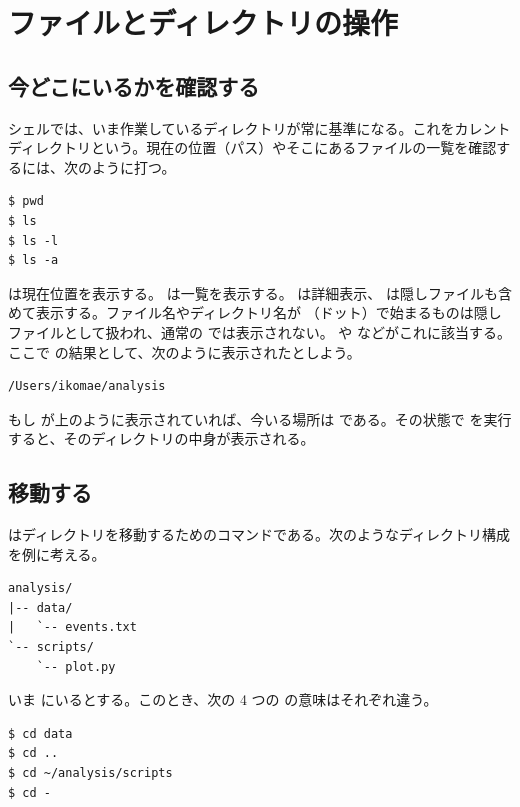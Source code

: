 \section{ファイルとディレクトリの操作}

\subsection{今どこにいるかを確認する}

シェルでは、いま作業しているディレクトリが常に基準になる。これをカレントディレクトリという。現在の位置（パス）やそこにあるファイルの一覧を確認するには、次のように打つ。

\begin{lstlisting}[numbers=none, xleftmargin=2\zw]
$ pwd
$ ls
$ ls -l
$ ls -a
\end{lstlisting}

 は現在位置を表示する。 は一覧を表示する。 は詳細表示、 は隠しファイルも含めて表示する。ファイル名やディレクトリ名が （ドット）で始まるものは隠しファイルとして扱われ、通常の  では表示されない。 や  などがこれに該当する。ここで  の結果として、次のように表示されたとしよう。

\begin{lstlisting}[numbers=none, xleftmargin=2\zw]
/Users/ikomae/analysis
\end{lstlisting}

もし  が上のように表示されていれば、今いる場所は  である。その状態で  を実行すると、そのディレクトリの中身が表示される。

\subsection{移動する}

 はディレクトリを移動するためのコマンドである。次のようなディレクトリ構成を例に考える。

\begin{lstlisting}[numbers=none, xleftmargin=2\zw]
analysis/
|-- data/
|   `-- events.txt
`-- scripts/
    `-- plot.py
\end{lstlisting}

いま  にいるとする。このとき、次の 4 つの  の意味はそれぞれ違う。

\begin{lstlisting}[numbers=none, xleftmargin=2\zw]
$ cd data
$ cd ..
$ cd ~/analysis/scripts
$ cd -
\end{lstlisting}

